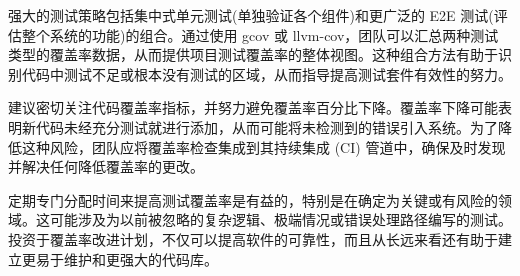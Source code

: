 强大的测试策略包括集中式单元测试(单独验证各个组件)和更广泛的 E2E 测试(评估整个系统的功能)的组合。通过使用 gcov 或 llvm-cov，团队可以汇总两种测试类型的覆盖率数据，从而提供项目测试覆盖率的整体视图。这种组合方法有助于识别代码中测试不足或根本没有测试的区域，从而指导提高测试套件有效性的努力。

建议密切关注代码覆盖率指标，并努力避免覆盖率百分比下降。覆盖率下降可能表明新代码未经充分测试就进行添加，从而可能将未检测到的错误引入系统。为了降低这种风险，团队应将覆盖率检查集成到其持续集成 (CI) 管道中，确保及时发现并解决任何降低覆盖率的更改。

定期专门分配时间来提高测试覆盖率是有益的，特别是在确定为关键或有风险的领域。这可能涉及为以前被忽略的复杂逻辑、极端情况或错误处理路径编写的测试。投资于覆盖率改进计划，不仅可以提高软件的可靠性，而且从长远来看还有助于建立更易于维护和更强大的代码库。












